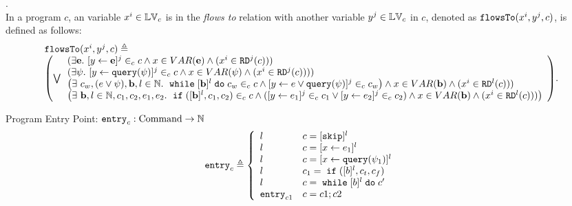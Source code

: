 \begin{defn}.
\label{def:flowsto}
\\
In a program  ${c}$,
an variable ${x^i}  \in \mathbb{LV}_c $ is in the \emph{flows to} relation with another variable ${y^j} \in \mathbb{LV}_c$
in ${c}$, denoted as $\mathtt{flowsTo}({x^i, y^j, c})$, is defined as follows:
%
\[
\begin{array}{l}
\flowsto({x^i, y^j, c}) \triangleq 
\\
\left( \bigvee
\begin{array}{l}
(\exists \sexpr . ~ [\assign{y}{\sexpr}]^j \in_{c} {c} 
\land {x} \in VAR(\sexpr) \land (x^i \in \live^j(c)))
\\
(\exists {\qexpr}. ~ [\assign{y}{\query({\qexpr})}]^j \in_{c} {c} 
\land x \in VAR({\qexpr}) \land (x^i \in \live^j(c))))
\\
\big(\exists  ~ {c_w}, {(\expr \lor \qexpr)}, \sbexpr, l \in \mathbb{N}. ~
	\ewhile [\sbexpr]^l \edo {c_w} \in_{c} {c}
	\land 
	[{\assign{y}{\expr \lor \query(\qexpr)}}]^{j} \in_{c}  {c_w}
\big) \land {x} \in VAR(\sbexpr) \land (x^i \in \live^l(c)))
\\
\big(
\exists ~ \sbexpr, l \in \mathbb{N}, {c_1}, {c_2}, {\expr}_1, {\expr}_2. ~
	\eif([\sbexpr]^l, {c_1}, {c_2}) \in_{c} {c} \land
	([{\assign{y}{\expr_1}}]^j \in_{c} {c_1} \lor 
	[{\assign{y}{\expr_2}}]^j \in_{c} {c_2})
\land {x} \in VAR(\sbexpr) \land (x^i \in \live^l(c)))
\big)
\end{array}
\right).
\end{array}
\]
%
\end{defn}
%
Program Entry Point: $\mathtt{entry}_c : \mbox{Command} \to \mathbb{N}$ 
\[
  \entry_c \triangleq 
\left\{
  \begin{array}{ll} 
     l       
    & c = [\eskip]{}^l
    \\ 
    l    & c = [\assign{x}{\expr_1}]{}^l
    \\ 
    l      
    & c = [\assign{x}{\query(\qexpr_1)}]{}^l
    \\
   l
    & c_1 = \eif([b]{}^l, c_t, c_f)
    \\ 
    l         
    & c = \ewhile [b]^l \edo c'
    \\ 
    \entry_{c1}
    & c = c1;c2
  \end{array}
  \right.
\]
%
